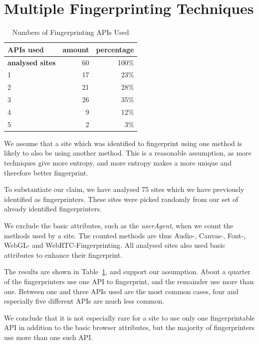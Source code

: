 \documentclass[
    fontsize=12pt,
    headings=small,
    parskip=half,
    bibliography=totoc,
    numbers=noenddot,
    open=any
    ]{scrreprt}
\begin{document}
\section{Multiple Fingerprinting Techniques}
\label{sec:correlation}

\begin{table}
\centering
\caption{Numbers of Fingerprinting APIs Used}
\begin{tabular}{l r r}
    \toprule
    APIs used & amount & percentage \\
    \midrule
    \textbf{analysed sites} & 60 & 100\% \\
    \midrule
    1 & 17 & 23\% \\
    2 & 21 & 28\% \\
    3 & 26 & 35\% \\
    4 & 9 & 12\% \\
    5 & 2 & 3\% \\
    \bottomrule
\end{tabular}
\label{table:multiple_apis}
\end{table}

We assume that a site which was identified to fingerprint using one method is likely
to also be using another method.
This is a reasonable assumption, as more techniques give more entropy, and more entropy makes a more
unique and therefore better fingerprint.

To substantiate our claim, we have analysed 75 sites which we have previously identified as fingerprinters.
These sites were picked randomly from our set of already identified fingerprinters.

We exclude the basic attributes, such as the \textit{userAgent}, when we count the methods used by a site.
The counted methods are thus Audio-, Canvas-, Font-, WebGL- and WebRTC-Fingerprinting.
All analysed sites also used basic attributes to enhance their fingerprint.

The results are shown in Table~\ref{table:multiple_apis}, and support our assumption. About a quarter of the fingerprinters
use one API to fingerprint, and the remainder use more than one.
Between one and three APIs used are the most common cases, four and especially five different APIs are much less common.

We conclude that it is not especially rare for a site to use only one fingerprintable API in addition
to the basic browser attributes, but the majority of fingerprinters use more than one such API.
\end{document}

